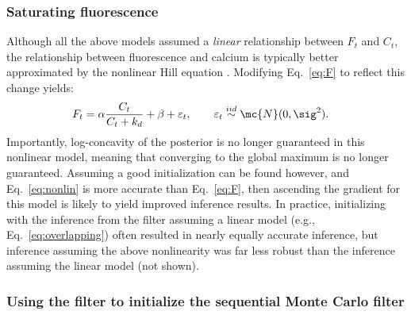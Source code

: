 \subsubsection{Saturating fluorescence}

Although all the above models assumed a \emph{linear} relationship between $F_t$ and $C_t$, the relationship between fluorescence and calcium is typically better approximated by the nonlinear Hill equation \cite{PologrutoSvoboda04}. Modifying Eq.~\eqref{eq:F} to reflect this change yields: 
\begin{align} \label{eq:nonlin}
	F_t &= \alpha \frac{C_t}{C_t+k_d} + \beta +  \varepsilon_t, \qquad \varepsilon_t \overset{iid}{\sim} \mc{N}(0,\sig^2).
\end{align}
Importantly, log-concavity of the posterior is no longer guaranteed in this nonlinear model, meaning that converging to the global maximum is no longer guaranteed.  Assuming a good initialization can be found however, and Eq.~\eqref{eq:nonlin} is more accurate than Eq.~\eqref{eq:F}, then ascending the gradient for this model is likely to yield improved inference results.  In practice, initializing with the  inference from the \foopsi filter assuming a linear model (e.g., Eq.~\eqref{eq:overlapping}) often resulted in nearly equally accurate inference, but inference assuming the above nonlinearity was far less robust than the inference assuming the linear model (not shown).  

\subsubsection{Using the \foopsi filter to initialize the sequential Monte Carlo filter}

